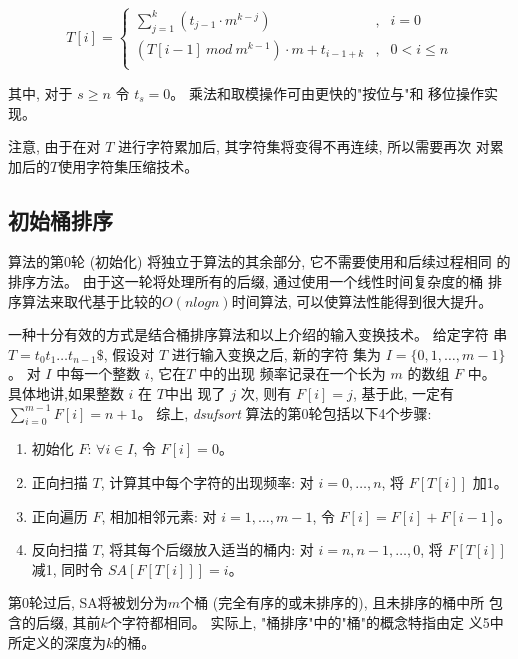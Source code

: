 \begin{equation}\label{eq:ca2}
 T[i]  = \left\{
  \begin{array}{lll}
    \sum_{j=1}^{k}(t_{j-1} \cdot m^{k-j})  &,  &  i = 0\\
    (T[i-1]~ mod~m^{k-1}) \cdot m + t_{i-1+k} &,  & 0 < i \leq n \\
    \end{array}\right.
\end{equation}

\par\noindent
其中, 对于 $s \geq n$ 令 $t_s = 0$。 乘法和取模操作可由更快的"按位与"和
移位操作实现。

注意, 由于在对 $T$ 进行字符累加后, 其字符集将变得不再连续, 所以需要再次
对累加后的$T$使用字符集压缩技术。

\subsection{初始桶排序}

算法的第0轮 (初始化) 将独立于算法的其余部分, 它不需要使用和后续过程相同
的排序方法。 由于这一轮将处理所有的后缀, 通过使用一个线性时间复杂度的桶
排序算法来取代基于比较的$O(nlogn)$时间算法, 可以使算法性能得到很大提升。

一种十分有效的方式是结合桶排序算法和以上介绍的输入变换技术。 给定字符
串 $T = t_0t_1 \dots t_{n-1}\$$, 假设对 $T$ 进行输入变换之后, 新的字符
集为 $I = \{0,1,\dots,m-1\}$。 对 $I$ 中每一个整数 $i$, 它在$T$ 中的出现
频率记录在一个长为 $m$ 的数组 $F$ 中。 具体地讲,如果整数 $i$ 在 $T$中出
现了 $j$ 次, 则有 $F[i] = j$, 基于此, 一定有 $\sum_{i=0}^{m-1} F[i] =
n + 1$。 综上, \emph{dsufsort} 算法的第0轮包括以下4个步骤:

\begin{enumerate}
\item 初始化 $F$: $\forall i \in I$, 令 $F[i] = 0$。
\item 正向扫描 $T$, 计算其中每个字符的出现频率: 对 $i =
  0,\dots,n$, 将 $F[T[i]]$ 加1。
\item 正向遍历 $F$, 相加相邻元素: 对 $i = 1, \dots, m-1$, 令 $F[i] =
  F[i] + F[i-1]$。
\item 反向扫描 $T$, 将其每个后缀放入适当的桶内: 对 $i = n, n-1,\dots,
  0$, 将 $F[T[i]]$ 减1, 同时令 $SA[F[T[i]]] = i$。
\end{enumerate}

第0轮过后, SA将被划分为$m$个桶 (完全有序的或未排序的), 且未排序的桶中所
包含的后缀, 其前$k$个字符都相同。 实际上, "桶排序"中的"桶"的概念特指由定
义5中所定义的深度为$k$的桶。

